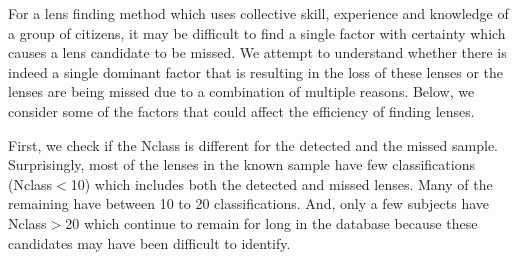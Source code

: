 \documentclass[useAMS,usenatbib,a4paper]{mn2e}
\begin{document}
For a lens finding method which uses collective skill, experience and
knowledge of a group of citizens, it may be difficult to find a single
factor with certainty which causes a lens candidate to be missed. We
attempt to understand whether there is indeed a single dominant factor
that is resulting in the loss of these lenses or the lenses are being
missed due to a combination of multiple reasons. Below, we consider some
of the factors that could affect the efficiency of finding lenses.

First, we check if the Nclass is different for the detected and the
missed sample. Surprisingly, most of the lenses in the known sample have
few classifications (Nclass$<$10) which includes both the detected and
missed lenses. Many of the remaining have between 10 to 20
classifications. And, only a few subjects have Nclass$>$20 which continue
to remain for long in the database because these candidates may have
been difficult to identify.
  
\end{document}
